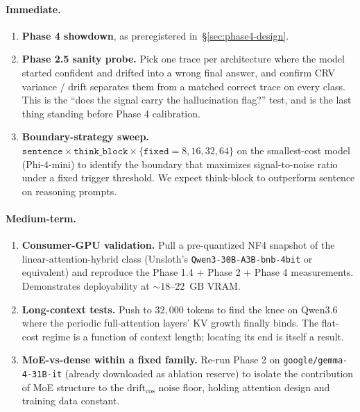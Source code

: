 \documentclass[11pt,letterpaper]{article}
\newcommand{\drift}{\mathrm{drift}_{\cos}}
\begin{document}
\paragraph{Immediate.}
\begin{enumerate}[label=F\arabic*., leftmargin=2.2em]
\item \textbf{Phase 4 showdown}, as preregistered
in~\S\ref{sec:phase4-design}.
\item \textbf{Phase 2.5 sanity probe.} Pick one trace per architecture
where the model started confident and drifted into a wrong final
answer, and confirm CRV variance / drift separates them from a matched
correct trace on every class. This is the
``does the signal carry the hallucination flag?'' test, and is the
last thing standing before Phase 4 calibration.
\item \textbf{Boundary-strategy sweep.}
$\texttt{sentence} \times \texttt{think\_block} \times
\{\texttt{fixed}=8, 16, 32, 64\}$ on the smallest-cost model
(Phi-4-mini) to identify the boundary that maximizes signal-to-noise
ratio under a fixed trigger threshold. We expect think-block
to outperform sentence on reasoning prompts.
\end{enumerate}

\paragraph{Medium-term.}
\begin{enumerate}[label=F\arabic*., resume, leftmargin=2.2em]
\item \textbf{Consumer-GPU validation.} Pull a pre-quantized
NF4 snapshot of the linear-attention-hybrid class
(Unsloth's \texttt{Qwen3-30B-A3B-bnb-4bit} or equivalent) and reproduce
the Phase 1.4 + Phase 2 + Phase 4 measurements. Demonstrates
deployability at $\sim 18$--$22$~GB VRAM.
\item \textbf{Long-context tests.} Push to $32{,}000$ tokens to find the
knee on Qwen3.6 where the periodic full-attention layers' KV growth
finally binds. The flat-cost regime is a function of context length;
locating its end is itself a result.
\item \textbf{MoE-vs-dense within a fixed family.} Re-run Phase 2 on
\texttt{google/gemma-4-31B-it} (already downloaded as ablation reserve)
to isolate the contribution of MoE structure to the $\drift$ noise floor,
holding attention design and training data constant.
\end{enumerate}
\end{document}
